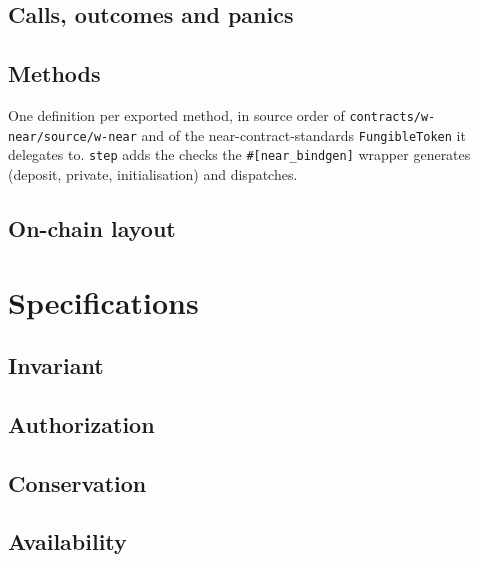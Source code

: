 
\section{Calls, outcomes and panics}


\section{Methods}

One definition per exported method, in source order of
\texttt{contracts/w-near/source/w-near} and of the near-contract-standards
\texttt{FungibleToken} it delegates to. \texttt{step} adds the checks the
\texttt{\#[near\_bindgen]} wrapper generates (deposit, private,
initialisation) and dispatches.


\section{On-chain layout}


\chapter{Specifications}
\label{ch:spec}

\section{Invariant}


\section{Authorization}


\section{Conservation}


\section{Availability}

